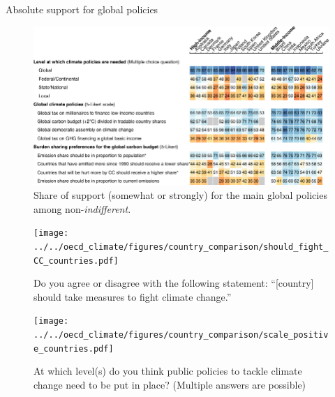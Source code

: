 \documentclass[aspectratio=169,xcolor=dvipsnames, 11pt,mathserif]{beamer}
\begin{document}
\begin{frame}{Absolute support for global policies\label{absolute_oecd} \hyperlink{global_policies}{}} 
\begin{figure}[h!]
    \centering		
    \caption{Share of support (somewhat or strongly) for the main global policies among non-\textit{indifferent}.   }
    \vspace{-.2cm}
    \includegraphics[height=.82\textheight]{../figures/OECD/Heatplot_global_tax_attitudes_positive.pdf} %
    \end{figure}
\end{frame}

\begin{frame}{} %
	\begin{figure}[h!]
	\centering
	\caption{Do you agree or disagree with the following statement: ``[country] should take measures to fight climate change.'' \hyperlink{global_policies}{}
	}
	\texttt{[image: ../../oecd\_climate/figures/country\_comparison/should\_fight\_CC\_countries.pdf]}
	\end{figure}
\end{frame}

\begin{frame}{}%
	\begin{figure}[h!]
	\centering
	\caption{
		At which level(s) do you think public policies to tackle climate change need to be put in place? (Multiple answers are possible) \hyperlink{global_policies}{}
	}
	\texttt{[image: ../../oecd\_climate/figures/country\_comparison/scale\_positive\_countries.pdf]}
	\end{figure}
\end{frame}
\end{document}
